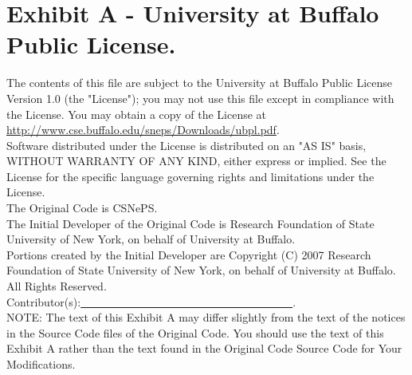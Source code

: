 \documentclass[letterpaper,colorlinks=true,linkcolor=blue]{book}
\begin{document}
\section*{Exhibit A - University at Buffalo Public License.}
The contents of this file are subject to the University at Buffalo
Public License Version 1.0 (the "License"); you may not use this
file except in compliance with the License. You may obtain a copy of
the License at \url{http://www.cse.buffalo.edu/sneps/Downloads/ubpl.pdf}.\\

\noindent Software distributed under the License is distributed on an "AS IS"
basis, WITHOUT WARRANTY OF ANY KIND, either express or implied. See the
License for the specific language governing rights and limitations
under the License.\\

\noindent The Original Code is CSNePS.\\

\noindent The Initial Developer of the Original Code is Research Foundation of State University of New York, on behalf of University at Buffalo.\\

\noindent Portions created by the Initial Developer are Copyright (C) 2007 Research Foundation of State University of New York, on behalf of University at Buffalo. All Rights Reserved.\\

\noindent Contributor(s):\underline{~~~~~~~~~~~~~~~~~~~~~~~~~~~~~~~~~~~~~~}.\\

\noindent NOTE: The text of this Exhibit A may differ slightly from the text of the notices in the Source Code files of the Original Code. You should use the text of this Exhibit A rather than the text found in the Original Code Source Code for Your Modifications.

\cleardoublepage
{}



\cleardoublepage
{}
\printindex
\end{document}
